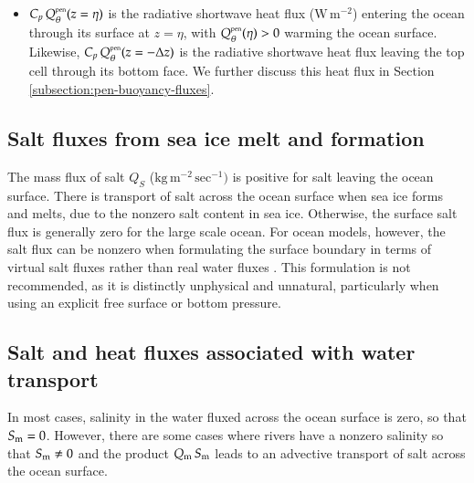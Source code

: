 \begin{itemize}
\item $C_{p} \, Q_{\theta}^{\mbox{\tiny pen}}(z=\eta)$ is the
  radiative shortwave heat flux ($\mbox{W} \, \mbox{m}^{-2}$) entering
  the ocean through its surface at $z=\eta$, with
  $Q_{\theta}^{\mbox{\tiny pen}}(\eta) > 0$ warming the ocean surface.
  Likewise, $C_{p} \, Q_{\theta}^{\mbox{\tiny pen}}(z=-\Delta z)$ is
  the radiative shortwave heat flux leaving the top cell through its
  bottom face.  We further discuss this heat flux in Section
  \ref{subsection:pen-buoyancy-fluxes}.

\end{itemize}


\subsection{Salt fluxes from sea ice melt and formation} 
\label{subsection:sea-ice-buoyancy-fluxes}

The mass flux of salt $Q_{S}$ ($\mbox{kg} \, \mbox{m}^{-2} \,
\mbox{sec}^{-1})$ is positive for salt leaving the ocean surface.
There is transport of salt across the ocean surface when sea ice forms
and melts, due to the nonzero salt content in sea ice.  Otherwise, the
surface salt flux is generally zero for the large scale ocean. For
ocean models, however, the salt flux can be nonzero when formulating
the surface boundary in terms of virtual salt fluxes rather than real
water fluxes \citep{Huang1993,GriffiesPacSchmidtBalaji2001}.  This
formulation is not recommended, as it is distinctly unphysical and
unnatural, particularly when using an explicit free surface or bottom
pressure.


\subsection{Salt and heat fluxes associated with water transport} 
\label{subsection:advective-buoyancy-fluxes}

In most cases, salinity in the water fluxed across the ocean surface
is zero, so that $S_{\mbox{\scriptsize m}}=0$.  However, there are some cases where rivers
have a nonzero salinity so that $S_{\mbox{\scriptsize m}} \ne 0$ and the product $Q_{\mbox{\scriptsize m}} \,
S_{\mbox{\scriptsize m}}$ leads to an advective transport of salt across the ocean surface.

